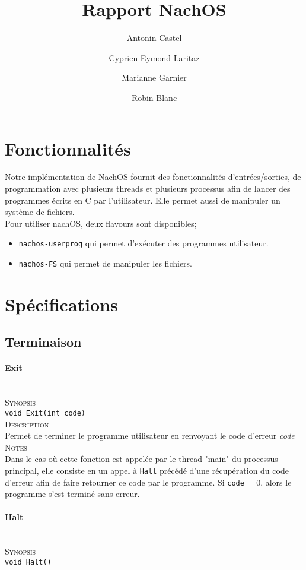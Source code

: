 \documentclass{report}
\title{Rapport NachOS}
\author{Antonin Castel \and
		Cyprien Eymond Laritaz \and
		Marianne Garnier \and
		Robin Blanc}
\newcommand{\myparagraph}[1]{\paragraph*{#1}\mbox{}\\}
\begin{document}
\maketitle

\section*{Fonctionnalités}
Notre implémentation de NachOS fournit des fonctionnalités d'entrées/sorties, de programmation avec plusieurs threads et plusieurs processus afin de lancer des programmes écrits en C par l'utilisateur.
Elle permet aussi de manipuler un système de fichiers.\\

Pour utiliser nachOS, deux flavours sont disponibles;
\begin{itemize}
 \item  \texttt{nachos-userprog} qui permet d'exécuter des programmes utilisateur.
 \item \texttt{nachos-FS} qui permet de manipuler les fichiers.
 \end{itemize}

\section*{Spécifications}


\subsection*{Terminaison}
\myparagraph{Exit}

\textsc{Synopsis}\\
	\texttt{void Exit(int code)}\\
	
\textsc{Description}\\
	Permet de terminer le programme utilisateur en renvoyant le code d'erreur \textit{code}\\
	
\textsc{Notes}\\
	Dans le cas où cette fonction est appelée par le thread "main" du processus principal, elle consiste en un appel à \texttt{Halt} précédé d'une récupération du code d'erreur afin de faire retourner ce code par le programme. Si \texttt{code} = 0, alors le programme s'est terminé sans erreur.
		
\myparagraph{Halt}

\textsc{Synopsis}\\
	\texttt{void Halt()}\\
	
\end{document}
